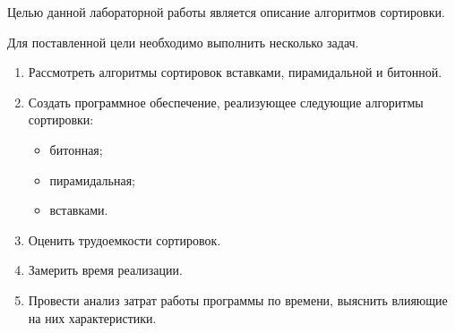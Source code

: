 Целью данной лабораторной работы является описание алгоритмов сортировки.

Для поставленной цели необходимо выполнить несколько задач.
\begin{enumerate}
	\item Рассмотреть алгоритмы сортировок вставками, пирамидальной и битонной.
	\item Создать программное обеспечение, реализующее следующие алгоритмы сортировки:
	\begin{itemize}
		\item битонная;
		\item пирамидальная;
		\item вставками.
	\end{itemize}
	\item Оценить трудоемкости сортировок.
	\item Замерить время реализации.
	\item Провести анализ затрат работы программы по времени, выяснить влияющие на них характеристики.
\end{enumerate}

